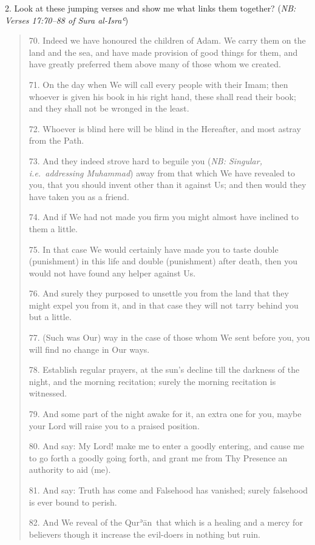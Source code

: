 \documentclass[12pt]{memoir}
\def\´{ʾ} %
\def\`{ʿ} %
\def \Quran{Qur\-\´ān} %
\newcommand{\QRef}[1]{{\color{darkblue}#1}}
\newcommand{\NB}[1]{\emph{\small NB: #1}}
\begin{document}
2. Look at these jumping verses and show me what links them together?
(\NB{Verses \QRef{17:70–88} of Sura al-Isra\`})

\begin{quote}
70. Indeed we have honoured the children of Adam.
We carry them on the land and the sea,
and have made provision of good things for them,
and have greatly preferred them above many of those whom we created.

71. On the day when We will call every people with their Imam;
then whoever is given his book in his right hand, these shall read their book;
and they shall not be wronged in the least.

72. Whoever is blind here will be blind in the Hereafter,
and most astray from the Path.

73. And they indeed strove hard to beguile you
(\NB{Singular, i.e.\ addressing Muhammad})
away from that which We have revealed to you,
that you should invent other than it against Us;
and then would they have taken you as a friend.

74. And if We had not made you firm
you might almost have inclined to them a little.

75. In that case We would certainly have made you to taste
double (punishment) in this life and double (punishment) after death,
then you would not have found any helper against Us.

76. And surely they purposed to unsettle you from the land
that they might expel you from it,
and in that case they will not tarry behind you but a little.

77. (Such was Our) way in the case of those whom We sent before you,
you will find no change in Our ways.

78. Establish regular prayers,
at the sun’s decline till the darkness of the night,
and the morning recitation; surely the morning recitation is witnessed.

79. And some part of the night awake for it, an extra one for you,
maybe your Lord will raise you to a praised position.

80. And say: My Lord! make me to enter a goodly entering,
and cause me to go forth a goodly going forth,
and grant me from Thy Presence an authority to aid (me).

81. And say: Truth has come and Falsehood has vanished;
surely falsehood is ever bound to perish.

82. And We reveal of the \Quran\ that which is a healing
and a mercy for believers though it increase the evil-doers
in nothing but ruin.


\end{quote}
\end{document}
